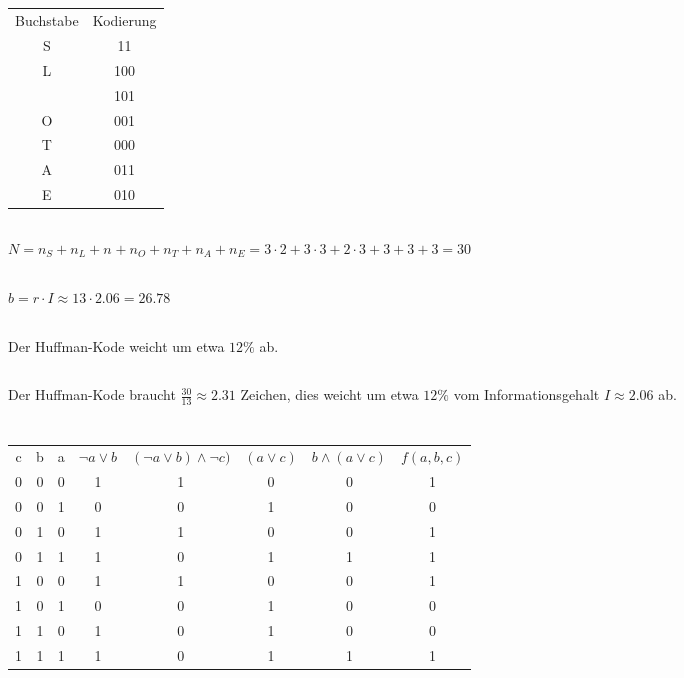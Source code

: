 \documentclass{article}
\begin{document}
\subsection{}
\begin{tabular}{c|c}
    Buchstabe&Kodierung\\
    S&11\\
    L&100\\
    &101\\
    O&001\\
    T&000\\
    A&011\\
    E&010\\
\end{tabular}
\subsection{}
$N = n_S+n_L+n_{}+n_O+n_T+n_A+n_E = 3\cdot 2+ 3\cdot 3+2\cdot 3+3+3+3 = 30$
\subsection{}
$b = r\cdot I \approx 13 \cdot 2.06 = 26.78$
\subsection{}
Der Huffman-Kode weicht um etwa $12\%$ ab.
\subsection{}
Der Huffman-Kode braucht $\frac{30}{13}\approx 2.31$ Zeichen,
dies weicht um etwa $12\%$ vom
Informationsgehalt $I\approx 2.06$ ab.
\section{}
\subsection{}
\begin{tabular}{c|c|c|c|c|c|c|c}
    c&b&a&$\neg a \lor b$&$(\neg a \lor b) \land \neg c)$&$(a\lor c)$&$b \land (a \lor c)$&$f(a,b,c)$\\
    0&0&0&1&1&0&0&1\\
    0&0&1&0&0&1&0&0\\
    0&1&0&1&1&0&0&1\\
    0&1&1&1&0&1&1&1\\
    1&0&0&1&1&0&0&1\\
    1&0&1&0&0&1&0&0\\
    1&1&0&1&0&1&0&0\\
    1&1&1&1&0&1&1&1\\
\end{tabular}
\end{document}
